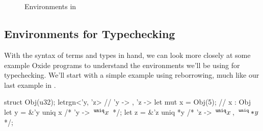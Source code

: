 \begin{figure}
  \figuresize
  \begin{bnf}
    \oxglobalctxgrammar \\
    \oxglobalentrygrammar \\
  \end{bnf}
  \begin{bnf}
    \oxtvarctxgrammar \\
    \oxkontctxgrammar \\
    \oxvarctxgrammar \\
    \oxframegrammar \\
    \oxenvgrammar \\
  \end{bnf}

  \vspace{-1em}
  \caption{Environments in \lang}
  \label{fig:envs}
  \vspace{-1em}
\end{figure}

\subsection{Environments for Typechecking}
\label{sec:envs}

With the syntax of terms and types in hand, we can look more closely at some
example Oxide programs to understand the environments we'll be using for
typechecking. We'll start with a simple example using reborrowing, much like our
last example in .

\begin{rustbk}
  struct Obj(u32);
  letrgn<'y, 'z> { // 'y -> {}, 'z -> {}
    let mut x = Obj(5); // x : Obj
    let y = &'y uniq x /* 'y -> { $\,^{\mathtt{uniq}}x\,$ } */;
    let z = &'z uniq *y /* 'z -> { $\,^{\mathtt{uniq}}x\,$, $\,^{\mathtt{uniq}}* \! y\,$ } */;
  }
\end{rustbk}

